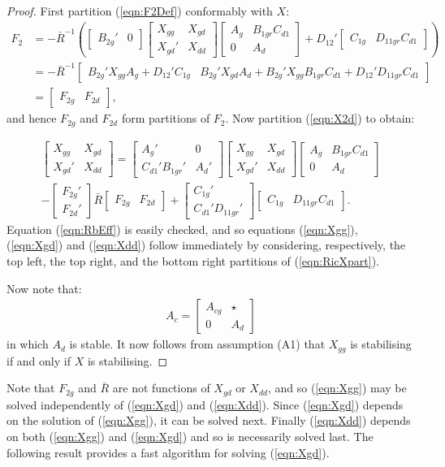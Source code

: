 \documentclass[a4paper,12pt]{article}
\theoremstyle{remark}
\newcommand{\ma}[1]{\begin{bmatrix} #1 \end{bmatrix}}
\newcommand{\als}[1]{\begin{align*} #1 \end{align*}}
\newcommand{\mln}[1]{\begin{multline} #1 \end{multline}}
\newcommand{\aln}[1]{\begin{align} #1 \end{align}}
\newcommand{\rf}[1]{{\mathbf{#1}}}
\newcommand{\F}{{\rf{ F}} }
\begin{document}
\begin{proof}
First partition (\ref{eqn:F2Def}) conformably with $X$:
\aln{
F_2&=-\bar R^{-1}\left( \ma{B_{2g}' & 0 } \ma{X_{gg} & X_{gd} \\ X_{gd}' & X_{dd}}\ma{A_g & B_{1gr}C_{d1}\\ 0 & A_d}+D_{12}'\ma{C_{1g} & D_{11gr}C_{d1}}\right) \nonumber \\
&=-\bar R^{-1}\ma{B_{2g}'X_{gg}A_g+D_{12}'C_{1g} & B_{2g}'X_{gd}A_d+B_{2g}'X_{gg}B_{1gr}C_{d1}+D_{12}'D_{11gr}C_{d1}} \nonumber \\
&=\ma{F_{2g} &F_{2d}}\label{eqn:F2part}
,}
and hence $F_{2g}$ and $F_{2d}$ form partitions of $F_2$.
Now partition (\ref{eqn:X2d}) to obtain:

\mln{
\ma{X_{gg} & X_{gd} \\ X_{gd}' & X_{dd}}=\ma{A_g' &0 \\ C_{d1}'B_{1gr}' & A_d'}\ma{X_{gg} & X_{gd} \\ X_{gd}' & X_{dd}} \ma{A_g & B_{1gr}C_{d1}\\ 0 & A_d}\\
	-\ma{F_{2g}'\\F_{2d}'}\bar R\ma{F_{2g}&F_{2d}}+\ma{C_{1g}'\\C_{d1}'D_{11gr}'}\ma{C_{1g}&D_{11gr}C_{d1}}.
	\label{eqn:RicXpart}
}
Equation (\ref{eqn:RbEff}) is easily checked, and so equations (\ref{eqn:Xgg}), (\ref{eqn:Xgd}) and (\ref{eqn:Xdd}) follow immediately by considering, respectively, the top left, the top right, and the bottom right partitions of (\ref{eqn:RicXpart}).

Now note that:
\als{
A_c=\ma{A_{cg} & \star \\ 0 & A_d}
}
in which $A_d$ is stable.  It now follows from assumption (A1) that $X_{gg}$ is stabilising if and only if $X$ is stabilising.
\end{proof}
%

Note that $F_{2g}$ and $\bar R$ are not functions of $X_{gd}$ or $X_{dd}$, and so (\ref{eqn:Xgg}) may be solved independently of (\ref{eqn:Xgd}) and (\ref{eqn:Xdd}). Since (\ref{eqn:Xgd}) depends on the solution of (\ref{eqn:Xgg}), it can be solved next. Finally (\ref{eqn:Xdd}) depends on both (\ref{eqn:Xgg}) and (\ref{eqn:Xgd}) and so is necessarily solved last. The following result provides a fast algorithm for solving (\ref{eqn:Xgd}).
\end{document}
